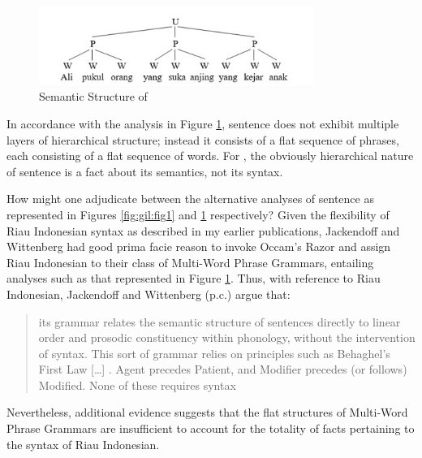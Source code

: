 \documentclass[output=paper,colorlinks,citecolor=brown
]{langscibook}
\begin{document}
\begin{figure}
\centering
\includegraphics[width=0.8\textwidth]{gil_figure3.png}
\caption{\label{fig:gil:fig3}Semantic Structure of }
\end{figure}

In accordance with the analysis in Figure \ref{fig:gil:fig3}, sentence  does not exhibit multiple layers of hierarchical structure; instead it consists of a flat sequence of phrases, each consisting of a flat sequence of words.  For \citet{jackendoff2014syntax,jackendoff2017linear}, the obviously hierarchical nature of sentence  is a fact about its semantics, not its syntax.

How might one adjudicate between the alternative analyses of sentence  as represented in Figures \ref{fig:gil:fig1} and \ref{fig:gil:fig3} respectively?  Given the flexibility of Riau Indonesian syntax as described in my earlier publications, Jackendoff and Wittenberg had good prima facie reason to invoke Occam's Razor and assign Riau Indonesian to their class of Multi-Word Phrase Grammars, entailing analyses such as that represented in Figure \ref{fig:gil:fig3}.  Thus, with reference to Riau Indonesian, Jackendoff and Wittenberg (p.c.) argue that:

\begin{quote}
      its grammar relates the semantic structure of sentences directly to linear order and
     prosodic constituency within phonology, without the intervention of syntax.  This sort of
     grammar relies on principles such as Behaghel’s First Law  [\ldots] . Agent precedes Patient, and
     Modifier precedes (or follows) Modified.  None of these requires syntax 
\end{quote}

Nevertheless, additional evidence suggests that the flat structures of Multi-Word Phrase Grammars are insufficient to account for the totality of facts pertaining to the syntax of Riau Indonesian.
\end{document}
